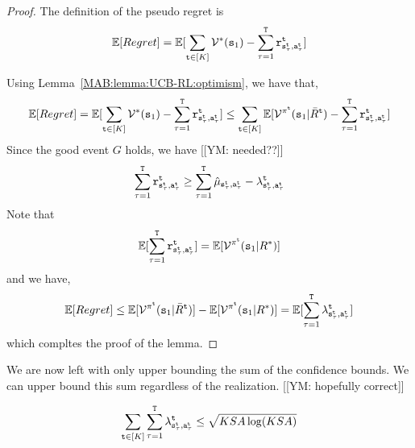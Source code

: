 \begin{proof}
    The definition of the pseudo regret is
    \[
    \mathbb{E}[Regret]= \mathbb{E}[\sum_{{\tt t}\in [K]} \mathcal{V}^*({\tt s}_1)-\sum_{\tau=1}^{\tt T} {\tt r}^{\tt t}_{{\tt s}_\tau^{\tt t},{\tt a}_\tau^{\tt t}}]
    \]

Using Lemma~\ref{MAB:lemma:UCB-RL:optimism}, we have that,
    \[
    \mathbb{E}[Regret]= \mathbb{E}[\sum_{{\tt t}\in [K]} \mathcal{V}^*({\tt s}_1)-\sum_{\tau=1}^{\tt T} {\tt r}^{\tt t}_{{\tt s}_\tau^{\tt t},{\tt a}_\tau^{\tt t}}]
    \leq
    \sum_{{\tt t}\in [K]}
    \mathbb{E}[\mathcal{V}^{\pi^{\tt t}}({\tt s}_1|\bar{R}^{\tt t})
    -\sum_{\tau=1}^{\tt T} {\tt r}^{\tt t}_{{\tt s}_\tau^{\tt t},{\tt a}_\tau^{\tt t}}]
    \]
Since the good event $G$ holds, we have [[YM: needed??]]
\[
\sum_{\tau=1}^{\tt T} {\tt r}^{\tt t}_{{\tt s}_\tau^{\tt t},{\tt a}_\tau^{\tt t}} \geq \sum_{\tau=1}^{\tt T}
 \hat{\mu}_{{\tt s}_\tau^{\tt t},{\tt a}_\tau^{\tt t}}-\lambda^{\tt t}_{{\tt s}_\tau^{\tt t},{\tt a}_\tau^{\tt t}}
\]
Note that
\[
\mathbb{E}[\sum_{\tau=1}^{\tt T} {\tt r}^{\tt t}_{{\tt s}_\tau^{\tt t},{\tt a}_\tau^{\tt t}} ] =\mathbb{E}[\mathcal{V}^{\pi^{\tt t}}({\tt s}_1|R^*)]
\]
and we have,
\[
\mathbb{E}[Regret]\leq \mathbb{E}[\mathcal{V}^{\pi^{\tt t}}({\tt s}_1|\bar{R}^{\tt t})] -
\mathbb{E}[\mathcal{V}^{\pi^{\tt t}}({\tt s}_1|R^*)]=
\mathbb{E}[\sum_{\tau=1}^{\tt T} \lambda^{\tt t}_{{\tt s}_\tau^{\tt t},{\tt a}_\tau^{\tt t}} ]
\]
which compltes the proof of the lemma.
\end{proof}

We are now left with only upper bounding the sum of the confidence bounds.
We can upper bound this sum regardless of the realization. [[YM: hopefully correct]]

\begin{lemma}
    \[
    \sum_{{\tt t}\in [K]} \sum_{\tau=1}^{\tt T}
\lambda^{\tt t}_{{\tt s}_\tau^{\tt t},{\tt a}_\tau^{\tt t}}
    \leq \sqrt{KSA\log (KSA)}
    \]
\end{lemma}

